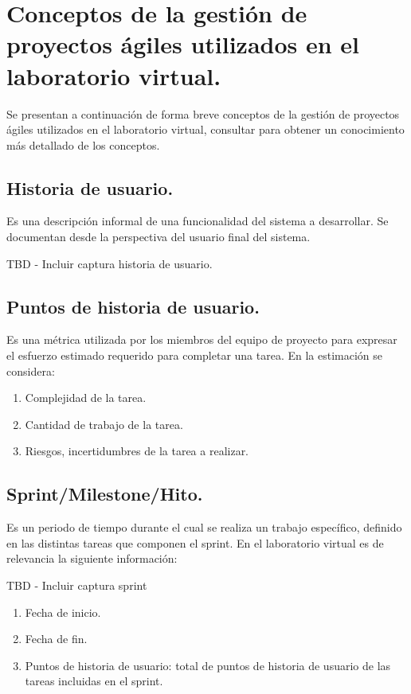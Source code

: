 
\section{Conceptos de la gestión de proyectos ágiles utilizados en el laboratorio virtual.}

Se presentan a continuación de forma breve conceptos de la gestión de proyectos ágiles utilizados en el laboratorio virtual, consultar \cite{agile-glossary} para obtener un conocimiento más detallado de los conceptos.

\subsection{Historia de usuario.}

Es una descripción informal de una funcionalidad del sistema a desarrollar. Se documentan desde la perspectiva del usuario final del sistema.

TBD - Incluir captura historia de usuario.

\subsection{Puntos de historia de usuario.}

Es una métrica utilizada por los miembros del equipo de proyecto para expresar el esfuerzo estimado requerido para completar una tarea. En la estimación se considera:

\begin{enumerate}
	\item Complejidad de la tarea.
	\item Cantidad de trabajo de la tarea.
	\item Riesgos, incertidumbres de la tarea a realizar.	
\end{enumerate}

\subsection{Sprint/Milestone/Hito.}

Es un periodo de tiempo durante el cual se realiza un trabajo específico, definido en las distintas tareas que componen el sprint. En el laboratorio virtual es de relevancia la siguiente información:

TBD - Incluir captura sprint

\begin{enumerate}
	\item Fecha de inicio.
	\item Fecha de fin.
	\item Puntos de historia de usuario: total de puntos de historia de usuario de las tareas incluidas en el sprint.	
\end{enumerate}

